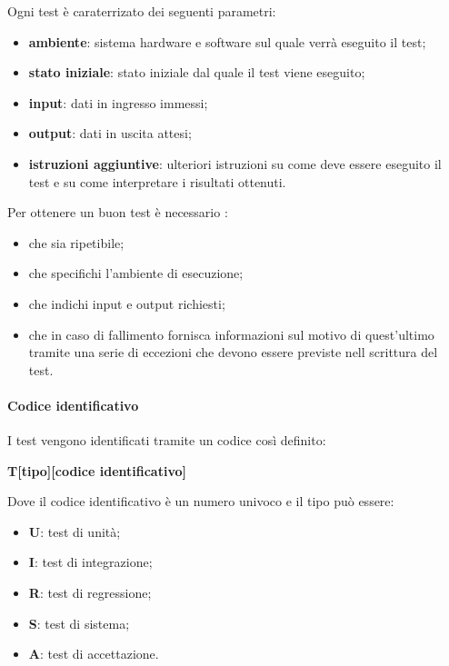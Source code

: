 Ogni test è caraterrizato dei seguenti parametri:
\begin{itemize}
	\item \textbf{ambiente}: sistema hardware e software sul quale verrà eseguito il test;
	\item \textbf{stato iniziale}: stato iniziale dal quale il test viene eseguito;
	\item \textbf{input}: dati in ingresso immessi;
	\item \textbf{output}: dati in uscita attesi; 
	\item\textbf{istruzioni aggiuntive}: ulteriori istruzioni su come deve essere eseguito il test e su come interpretare i risultati ottenuti.
\end{itemize}
Per ottenere un buon test è necessario :
\begin{itemize}
	\item che sia ripetibile;
	\item che specifichi l'ambiente di esecuzione;
	\item che indichi input e output richiesti;
	\item che in caso di fallimento fornisca informazioni sul motivo di quest'ultimo tramite una serie di eccezioni che devono essere previste nell scrittura del test.
\end{itemize}


\paragraph{Codice identificativo}
I test vengono identificati tramite un codice così definito:

\begin{center} \textbf{T[tipo][codice identificativo]} \end{center}

Dove il codice identificativo è un numero univoco e il tipo può essere:
\begin{itemize}
	\item \textbf{U}: test di unità;
	\item \textbf{I}: test di integrazione;
	\item \textbf{R}: test di regressione;
	\item \textbf{S}: test di sistema;
	\item \textbf{A}: test di accettazione.
\end{itemize}

